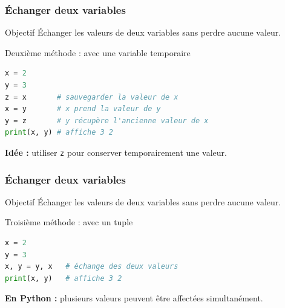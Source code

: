 \documentclass[10pt]{beamer}
\begin{document}
\begin{frame}[containsverbatim]
\frametitle{Échanger deux variables}
\begin{block}{Objectif}
	Échanger les valeurs de deux variables sans perdre aucune valeur.
\end{block}
\vspace{0.25cm}
\begin{exampleblock}{Deuxième méthode : avec une variable temporaire}
\begin{lstlisting}[language=Python]
x = 2
y = 3
z = x       # sauvegarder la valeur de x
x = y       # x prend la valeur de y
y = z       # y récupère l'ancienne valeur de x
print(x, y) # affiche 3 2
\end{lstlisting}
\end{exampleblock}
\vspace{0.15cm}
\begin{center}
	\textbf{Idée :} utiliser \texttt{z} pour conserver temporairement une valeur.
\end{center}
\end{frame}

\begin{frame}[containsverbatim]
	\frametitle{Échanger deux variables}
	
	\begin{block}{Objectif}
		Échanger les valeurs de deux variables sans perdre aucune valeur.
	\end{block}
	\vspace{0.25cm}
	
\begin{exampleblock}{Troisième méthode : avec un tuple}
\begin{lstlisting}[language=Python]
x = 2
y = 3
x, y = y, x   # échange des deux valeurs
print(x, y)   # affiche 3 2
\end{lstlisting}
\end{exampleblock}
	\vspace{0.15cm}
	\begin{center}
		\textbf{En Python :} plusieurs valeurs peuvent être affectées simultanément.
	\end{center}
\end{frame}
\end{document}
